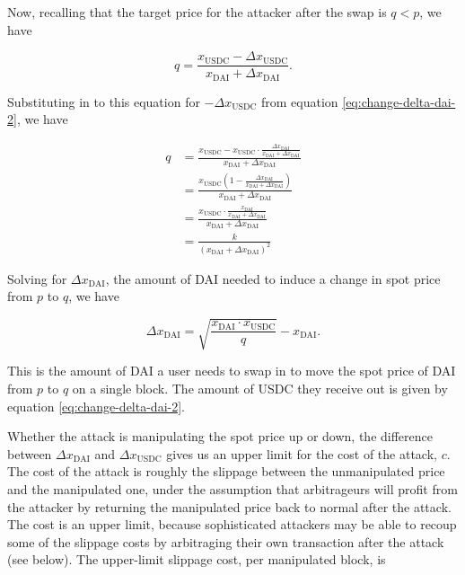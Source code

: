 \documentclass[a4paper, 11pt]{article}
\begin{document}
Now, recalling that the target price for the attacker after the swap is $q < p$, we have

\begin{equation}
q
=
\frac{x_{\text{USDC}} - \Delta x_{\text{USDC}}}{x_{\text{DAI}} + \Delta x_{\text{DAI}}}.
\end{equation}

Substituting in to this equation for $-\Delta x_{\text{USDC}}$ from equation \eqref{eq:change-delta-dai-2}, we have

\begin{align}
q
&=
\frac{x_{\text{USDC}} -x_{\text{USDC}} \cdot \frac{\Delta x_{\text{DAI}}}{x_{\text{DAI}} + \Delta x_{\text{DAI}}}}{x_{\text{DAI}} + \Delta x_{\text{DAI}}} \\ \nonumber
&=
\frac{x_{\text{USDC}} \left(1 - \frac{\Delta x_{\text{DAI}}}{x_{\text{DAI}} + \Delta x_{\text{DAI}}} \right)}{x_{\text{DAI}} + \Delta x_{\text{DAI}}} \\ \nonumber
&=
\frac{x_{\text{USDC}} \cdot \frac{x_{\text{DAI}}}{x_{\text{DAI}} + \Delta x_{\text{DAI}}} }{x_{\text{DAI}} + \Delta x_{\text{DAI}}} \\ \nonumber
&=
\frac{k}{(x_{\text{DAI}} + \Delta x_{\text{DAI}})^2}
\end{align}

Solving for $\Delta x_{\text{DAI}}$, the amount of DAI needed to induce a change in spot price from $p$ to $q$, we have

\begin{equation}
\label{eq:change-delta-usdc-2}
\Delta x_{\text{DAI}}
=
\sqrt{\frac{x_{\text{DAI}} \cdot x_{\text{USDC}}}{q}} - x_{\text{DAI}}.
\end{equation}

This is the amount of DAI a user needs to swap in to move the spot price of DAI from $p$ to $q$ on a single block. The amount of USDC they receive out is given by equation \eqref{eq:change-delta-dai-2}. 

Whether the attack is manipulating the spot price up or down, the difference between $\Delta x_{\text{DAI}}$ and $\Delta x_{\text{USDC}}$ gives us an upper limit for the cost of the attack, $c$. The cost of the attack is roughly the slippage between the unmanipulated price and the manipulated one, under the assumption that arbitrageurs will profit from the attacker by returning the manipulated price back to normal after the attack. The cost is an upper limit, because sophisticated attackers may be able to recoup some of the slippage costs by arbitraging their own transaction after the attack (see below). The upper-limit slippage cost, per manipulated block, is
\end{document}
